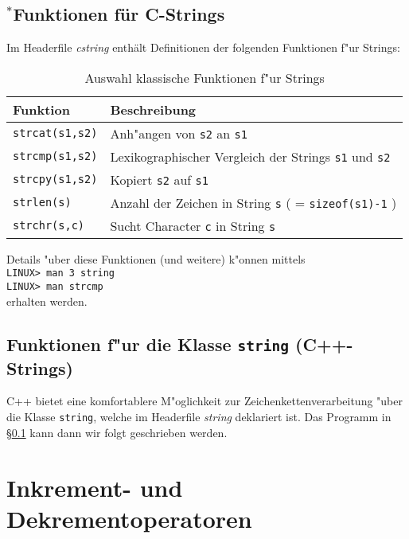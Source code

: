 \subsection{\mbox{}$^{*}$Funktionen für C-Strings}
\label{p:3.6.2}
%
Im Headerfile \textit{cstring} enthält Definitionen der
folgenden Funktionen f"ur Strings:
%
\begin{table}[htb]
\begin{tabular} {l@{\quad}p{}}
 Funktion & Beschreibung \\ \hline
 \verb|strcat(s1,s2)|  & Anh"angen von \verb|s2| an \verb|s1|  \\
 \verb|strcmp(s1,s2)|  & Lexikographischer Vergleich der Strings
 			\verb|s1| und \verb|s2|  \\
 \verb|strcpy(s1,s2)|  & Kopiert \verb|s2| auf \verb|s1| \\
 \verb|strlen(s)|      & Anzahl der Zeichen in String \verb|s|
 		( = \verb|sizeof(s1)-1| )\\
 \verb|strchr(s,c)|    & Sucht Character \verb|c| in String \verb|s|
\end{tabular}
 \caption{Auswahl klassische Funktionen f"ur Strings\label{tab:strings}}
\end{table}
%
%
Details "uber diese Funktionen (und weitere) k"onnen mittels \\
\verb|LINUX> man 3 string| \\
\verb|LINUX> man strcmp|   \\
erhalten werden.
\fi
%
%
%
\subsection{Funktionen f"ur die Klasse \texttt{string} (C++-Strings)}
\label{p:3.6.3}
%
C++ bietet eine komfortablere M"oglichkeit zur Zeichenkettenverarbeitung
"uber die Klasse \texttt{string}, welche im Headerfile \textit{string}
deklariert ist. 
\ifcteil
Das Programm in \S\ref{p:3.6.2} kann dann wir folgt geschrieben werden.
\fi
{}
%
%
\section{Inkrement- und Dekrementoperatoren}
\label{p:3.7}
